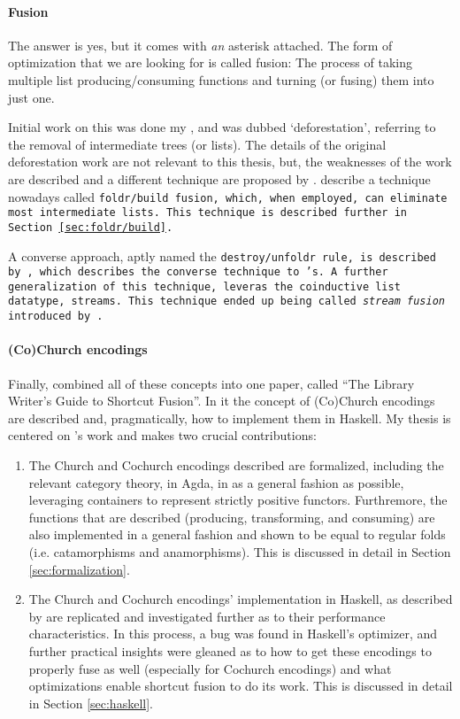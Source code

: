 \paragraph{Fusion}
The answer is yes{\Large*}, but it comes with \textit{an} asterisk attached.
The form of optimization that we are looking for is called fusion:
The process of taking multiple list producing/consuming functions and turning (or fusing) them into just one.

Initial work on this was done my \cite{Wadler1984,Wadler1986,Wadler1990}, and was dubbed `deforestation', referring to the removal of intermediate trees (or lists).
The details of the original deforestation work are not relevant to this thesis, but, the weaknesses of the work are described and a different technique are proposed by \cite{Gill1993}.
\cite{Gill1993} describe a technique nowadays called \tt{foldr/build} fusion, which, when employed, can eliminate most intermediate lists.
This technique is described further in Section \ref{sec:foldr/build}.

A converse approach, aptly named the \tt{destroy/unfoldr} rule, is described by \cite{Svenningsson2002}, which describes the converse technique to \cite{Gill1993}'s.
A further generalization of this technique, leveras the coinductive list datatype, streams. This technique ended up being called \textit{stream fusion} introduced by \cite{Coutts2007}.

\paragraph{(Co)Church encodings}
Finally, \cite{Harper2011} combined all of these concepts into one paper, called ``The Library Writer's Guide to Shortcut Fusion''. In it the concept of (Co)Church encodings are described and, pragmatically, how to implement them in Haskell.
My thesis is centered on \cite{Harper2011}'s work and makes two crucial contributions:
\begin{enumerate}
    \item The Church and Cochurch encodings described are formalized, including the relevant category theory, in Agda, in as a general fashion as possible, leveraging containers \citep{Abbott2005} to represent strictly positive functors.
    Furthremore, the functions that are described (producing, transforming, and consuming) are also implemented in a general fashion and shown to be equal to regular folds (i.e. catamorphisms and anamorphisms).
    This is discussed in detail in Section \ref{sec:formalization}.
    \item The Church and Cochurch encodings' implementation in Haskell, as described by \cite{Harper2011} are replicated and investigated further as to their performance characteristics.
    In this process, a bug was found in Haskell's optimizer, and further practical insights were gleaned as to how to get these encodings to properly fuse as well (especially for Cochurch encodings) and what optimizations enable shortcut fusion to do its work.
    This is discussed in detail in Section \ref{sec:haskell}.
\end{enumerate}



